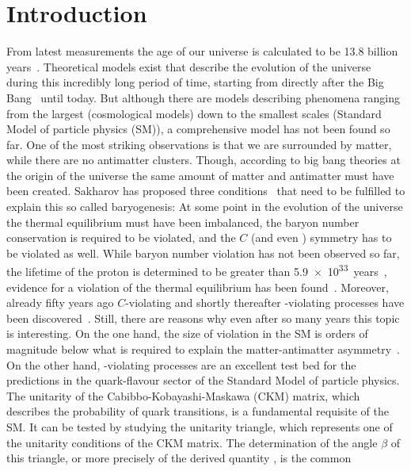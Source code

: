 
\chapter{Introduction}
\label{sec:Introduction}

From latest measurements the age of our universe is calculated to be
\num{13.8} billion years~\cite{Ade:2015xua}. Theoretical models exist that
describe the evolution of the universe during this incredibly long period of
time, starting from directly after the Big Bang~\cite{BigBang} until today.
But although there are models describing phenomena ranging from the largest
(cosmological models) down to the smallest scales (Standard Model of particle
physics (SM)), a comprehensive model has not been found so far. One of the
most striking observations is that we are surrounded by matter, while there
are no antimatter clusters. Though, according to big bang theories at the
origin of the universe the same amount of matter and antimatter must have been
created. Sakharov has proposed three conditions~\cite{Sakharov:1967dj} that
need to be fulfilled to explain this so called baryogenesis: At some point in
the evolution of the universe the thermal equilibrium must have been imbalanced,
the baryon number conservation is required to be violated, and the $C$ (and
even \CP) symmetry has to be violated as well. While baryon number violation
has not been observed so far, \eg the lifetime of the proton is determined to
be greater than \SI{5.9e33}{years}~\cite{Abe:2014mwa}, evidence for a
violation of the thermal equilibrium has been found~\cite{ThermalEquilibrium}.
Moreover, already fifty years ago $C$-violating and shortly thereafter
\CP-violating processes have been discovered~\cite{CPV_discovery}. Still,
there are reasons why even after so many years this topic is interesting. On
the one hand, the size of \CP violation in the SM is orders of magnitude below
what is required to explain the matter-antimatter
asymmetry~\cite{Huet:1994jb}. On the other hand, \CP-violating processes are
an excellent test bed for the predictions in the quark-flavour sector of the
Standard Model of particle physics. The unitarity of the
Cabibbo-Kobayashi-Maskawa (CKM) matrix, which describes the probability of
quark transitions, is a fundamental requisite of the SM. It can be tested by
studying the unitarity triangle, which represents one of the unitarity
conditions of the CKM matrix. The determination of the angle $\beta$ of this
triangle, or more precisely of the derived quantity \sintwobeta, is the common
